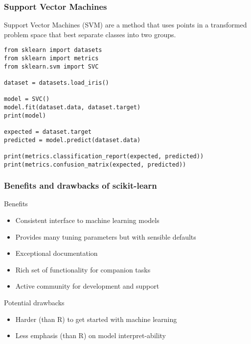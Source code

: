 \begin{frame}[fragile]\frametitle{Support Vector Machines}
Support Vector Machines (SVM) are a method that uses points in a transformed problem space that best separate classes into two groups. 
\begin{lstlisting}
from sklearn import datasets
from sklearn import metrics
from sklearn.svm import SVC

dataset = datasets.load_iris()

model = SVC()
model.fit(dataset.data, dataset.target)
print(model)

expected = dataset.target
predicted = model.predict(dataset.data)

print(metrics.classification_report(expected, predicted))
print(metrics.confusion_matrix(expected, predicted))
\end{lstlisting}
\end{frame}

\begin{frame}[fragile]\frametitle{Benefits and drawbacks of scikit-learn}
Benefits
\begin{itemize}
\item Consistent interface to machine learning models
\item Provides many tuning parameters but with sensible defaults
\item Exceptional documentation
\item Rich set of functionality for companion tasks
\item Active community for development and support
\end{itemize}
Potential drawbacks
\begin{itemize}
\item Harder (than R) to get started with machine learning
\item Less emphasis (than R) on model interpret-ability
\end{itemize}
\end{frame}








